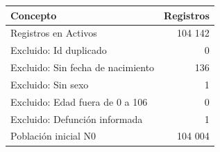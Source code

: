 \begin{tabular}{lr}
\toprule
Concepto & Registros \\
\midrule
Registros en Activos & 104 142 \\
Excluido: Id duplicado & 0 \\
Excluido: Sin fecha de nacimiento & 136 \\
Excluido: Sin sexo & 1 \\
Excluido: Edad fuera de 0 a 106 & 0 \\
Excluido: Defunción informada & 1 \\
Población inicial N0 & 104 004 \\
\bottomrule
\end{tabular}
